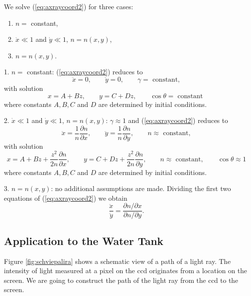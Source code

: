 \documentclass{article}
\begin{document}
\bigskip
We solve (\ref{eq:axraycoord2}) for three cases:
\begin{enumerate}
\item $n=$ constant,
\item $\dot{x} \ll 1$ and $\dot{y} \ll 1$, $n=n(x,y)$,
\item $n=n(x,y)$.
\end{enumerate}
\bigskip 

1. $n=$ constant: (\ref{eq:axraycoord2}) reduces to
\begin{equation}
	\ddot{x} = 0, \qquad \ddot{y} = 0, \qquad \gamma = \mbox{ constant},
\end{equation}
with solution
\begin{equation}
	x = A+Bz, \qquad y=C+Dz, \qquad \cos \theta = \mbox{ constant }
\end{equation}
where constants $A,B, C$ and $D$ are determined by initial conditions.
\bigskip

2. $\dot{x} \ll 1$ and $\dot{y} \ll 1$, $n=n(x,y)$: $\gamma \approx 1$ and (\ref{eq:axraycoord2}) reduces to
\begin{equation}
	\ddot{x} = \frac{1}{n} \frac{\partial n}{\partial x}, \qquad
		\ddot{y} = \frac{1}{n} \frac{\partial n}{\partial y}, \qquad n \approx \mbox{ constant},
\end{equation}
with solution
\begin{equation}
	x = A + B z + \frac{z^2}{2 n} \frac{\partial n}{\partial x}, \qquad y = C + D z + \frac{z^2}{2 n} \frac{\partial n}{\partial y}, \qquad n \approx \mbox{ constant}, \qquad \cos \theta \approx 1
\end{equation}
where constants $A,B, C$ and $D$ are determined by initial conditions.
\bigskip

3. $n=n(x,y)$: no additional assumptions are made. Dividing the first two equations of (\ref{eq:axraycoord2}) we obtain
\begin{equation}
	\frac{\ddot{x}}{\ddot{y}} = \frac{\partial n / \partial x}{\partial n / \partial y}.
\end{equation}

\subsection{Application to the Water Tank}
Figure \ref{fig:schviepalira} shows a schematic view of a path of a light ray. The intensity of light measured at a pixel on the ccd originates from a location on the screen. We are going to construct the path of the light ray from the ccd to the screen.
\end{document}
